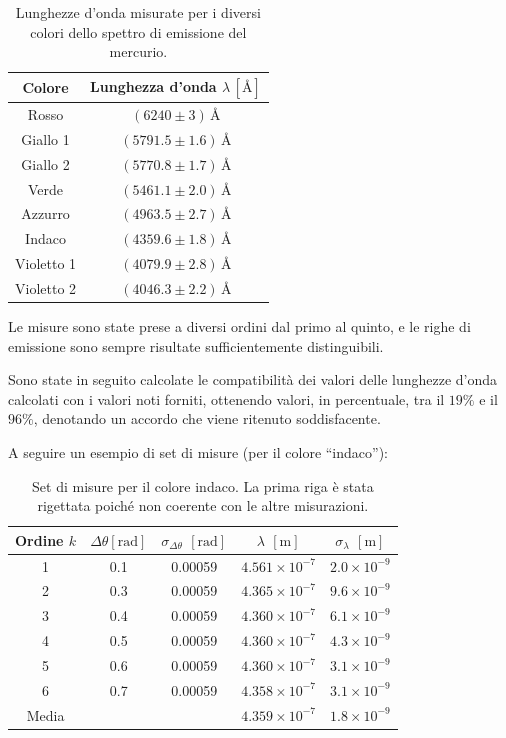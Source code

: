 \documentclass[a4paper,12pt]{article}
\begin{document}
\begin{table}[H]
    \centering
    \begin{tabular}{cc}
    \hline
    \textbf{Colore} & \textbf{Lunghezza d'onda} \(\lambda \, [\text{\AA}]\) \\ 
    \hline
    Rosso & \( (6240 \pm 3) \, \text{\AA} \) \\ 
    Giallo 1 & \( (5791.5 \pm 1.6) \, \text{\AA} \) \\ 
    Giallo 2 & \( (5770.8 \pm 1.7) \, \text{\AA} \) \\ 
    Verde & \( (5461.1 \pm 2.0) \, \text{\AA} \) \\ 
    Azzurro & \( (4963.5 \pm 2.7) \, \text{\AA} \) \\ 
    Indaco & \( (4359.6 \pm 1.8) \, \text{\AA} \) \\ 
    Violetto 1 & \( (4079.9 \pm 2.8) \, \text{\AA} \) \\ 
    Violetto 2 & \( (4046.3 \pm 2.2) \, \text{\AA} \) \\ 
    \hline
    \end{tabular}
    \caption{Lunghezze d'onda misurate per i diversi colori dello spettro di emissione del mercurio.}
    \end{table}
    
Le misure sono state prese a diversi ordini dal primo al quinto, e le righe di emissione sono sempre risultate sufficientemente distinguibili.

Sono state in seguito calcolate le compatibilità dei valori delle lunghezze d’onda calcolati con i valori noti forniti, ottenendo valori, in percentuale, tra il \( 19\% \) e il \( 96\% \), denotando un accordo che viene ritenuto soddisfacente.

A seguire un esempio di set di misure (per il colore “indaco”):

\begin{table}[H]
\centering
\begin{tabular}{ccccc}
\hline
\textbf{Ordine \(k\)}  & \textbf{\(\Delta \theta \)}\([\text{rad}]\) & \textbf{\(\sigma_{\Delta \theta}\)} \([\text{rad}]\) & \textbf{\(\lambda\)}  \([\text{m}]\) & \textbf{\(\sigma_\lambda\)} \([\text{m}]\) \\ 
\hline
1 & 0.1 & 0.00059 & \(4.561 \times 10^{-7}\) & \(2.0 \times 10^{-9}\) \\ 
2 & 0.3 & 0.00059 & \(4.365 \times 10^{-7}\) & \(9.6 \times 10^{-9}\) \\ 
3 & 0.4 & 0.00059 & \(4.360 \times 10^{-7}\) & \(6.1 \times 10^{-9}\) \\ 
4 & 0.5 & 0.00059 & \(4.360 \times 10^{-7}\) & \(4.3 \times 10^{-9}\) \\ 
5 & 0.6 & 0.00059 & \(4.360 \times 10^{-7}\) & \(3.1 \times 10^{-9}\) \\ 
6 & 0.7 & 0.00059 & \(4.358 \times 10^{-7}\) & \(3.1 \times 10^{-9}\) \\ 
\hline
Media & & & \(4.359 \times 10^{-7}\) & \(1.8 \times 10^{-9}\) \\ 
\hline
\end{tabular}
\caption{Set di misure per il colore indaco. La prima riga è stata rigettata poiché non coerente con le altre misurazioni.}
\end{table}
\end{document}

